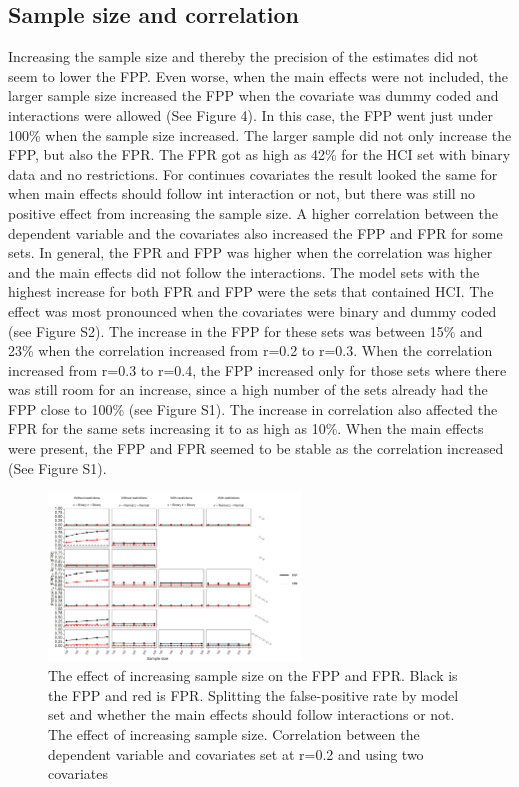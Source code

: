 \subsection{Sample size and correlation}
Increasing the sample size and thereby the precision of the estimates did not seem to lower the FPP. Even worse, when the main effects were not included, the larger sample size increased the FPP when the covariate was dummy coded and interactions were allowed (See Figure 4). In this case, the FPP went just under 100\% when the sample size increased. The larger sample did not only increase the FPP, but also the FPR. The FPR got as high as 42\% for the HCI set with binary data and no restrictions. For continues covariates the result looked the same for when main effects should follow int interaction or not, but there was still no positive effect from increasing the sample size. 
A higher correlation between the dependent variable and the covariates also increased the FPP and FPR for some sets. In general, the FPR and FPP was higher when the correlation was higher and the main effects did not follow the interactions. The model sets with the highest increase for both FPR and FPP were the sets that contained HCI. The effect was most pronounced when the covariates were binary and dummy coded (see Figure S2). The increase in the FPP for these sets was between 15\% and 23\% when the correlation increased from r=0.2 to r=0.3. When the correlation increased from r=0.3 to r=0.4, the FPP increased only for those sets where there was still room for an increase, since a high number of the sets already had the FPP close to 100\% (see Figure S1). The increase in correlation also affected the FPR for the same sets increasing it to as high as 10\%. When the main effects were present, the FPP and FPR seemed to be stable as the correlation increased (See Figure S1).

\begin{figure}[t]
\includegraphics[width=0.6\textwidth]{R/Analysis/Result/Figures/Figure1D.jpeg}
\centering
\caption{The effect of increasing sample size on the FPP and FPR. Black is the FPP and red is FPR.  Splitting the false-positive rate by model set and whether the main effects should follow interactions or not. The effect of increasing sample size. Correlation between the dependent variable and covariates set at r=0.2 and using two covariates}
\label{fig:mainfigure}
\end{figure}
